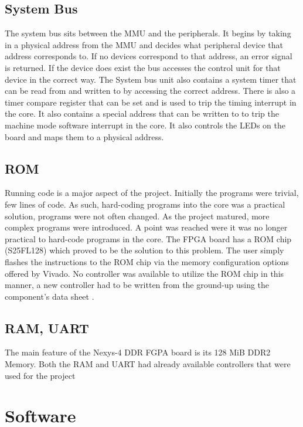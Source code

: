\documentclass{article}
\begin{document}
    \subsection{System Bus}
    The system bus sits between the MMU and the peripherals. It begins by taking in a physical address from the MMU and decides what peripheral device that address corresponds to. If no devices correspond to that address, an error signal is returned. If the device does exist the bus accesses the control unit for that device in the correct way. The System bus unit also contains a system timer that can be read from and written to by accessing the correct address. There is also a timer compare register that can be set and is used to trip the timing interrupt in the core. It also contains a special address that can be written to to trip the machine mode software interrupt in the core. It also controls the LEDs on the board and maps them to a physical address.
    
    \subsection{ROM}
    Running code is a major aspect of the project. Initially the programs were trivial, few lines of code.  As such, hard-coding programs into the core was a practical solution, programs were not often changed. As the project matured, more complex programs were introduced. A point was reached were it was no longer practical to hard-code programs in the core. The FPGA board has a ROM chip (S25FL128) which proved to be the solution to this problem. The user simply flashes the instructions to the ROM chip via the memory configuration options offered by Vivado. No controller was available to utilize the ROM chip in this manner, a new controller had to be written from the ground-up using the component's data sheet \cite{ROM}. 
    
    \subsection{RAM, UART}
    The main feature of the Nexys-4 DDR FGPA board is its 128 MiB DDR2 Memory. Both the RAM and UART had already available controllers that were used for the project

\section{Software}
\end{document}
